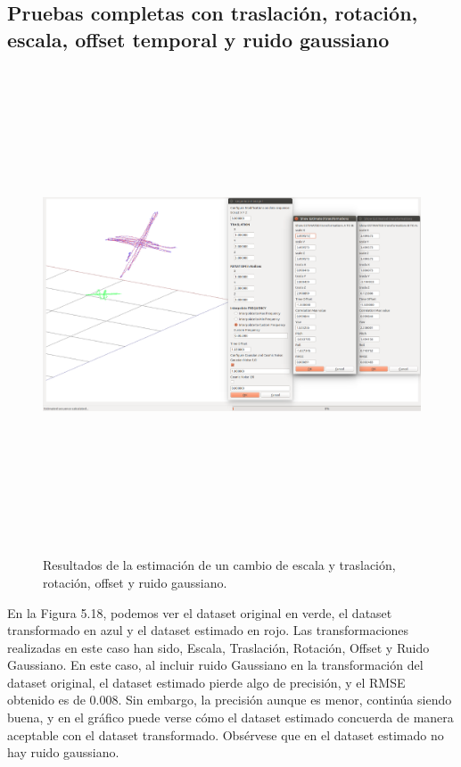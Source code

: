 \subsection{Pruebas completas con traslación, rotación, escala, offset temporal y ruido gaussiano}
\begin{figure}[H]
\begin{center}
\label{fig:opciones de View}\includegraphics[height=14.0cm,width=18.0cm]{img/cap6/Escala_Trasla_Rota_Offset_GaussNoise_abba.png}
\hspace{0.5cm}

\end{center}

\caption{Resultados de la estimación de un cambio de escala y traslación, rotación, offset y ruido gaussiano.}
\end{figure}
En la Figura 5.18, podemos ver el dataset original en verde, el dataset transformado en azul y el dataset estimado en rojo.
Las transformaciones realizadas en este caso han sido, Escala, Traslación, Rotación, Offset y Ruido Gaussiano.
En este caso, al incluir ruido Gaussiano en la transformación del dataset original, el dataset estimado pierde algo de precisión, y el RMSE obtenido es de  0.008.
Sin embargo, la precisión aunque es menor, continúa siendo buena, y en el gráfico puede verse cómo el dataset estimado concuerda de manera aceptable con el dataset transformado. Obsérvese que en el dataset estimado no hay ruido gaussiano.
